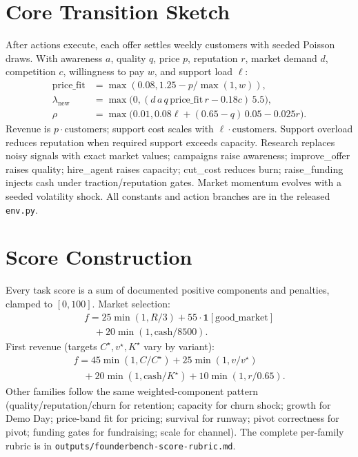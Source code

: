\documentclass[sigconf]{acmart}
\begin{document}
\section{Core Transition Sketch}
After actions execute, each offer settles weekly customers with seeded Poisson draws.
With awareness $a$, quality $q$, price $p$, reputation $r$, market demand $d$, competition $c$, willingness to pay $w$, and support load $\ell$:
\begin{align*}
\mathrm{price\_fit}&=\max(0.08,1.25-p/\max(1,w)),\\
\lambda_{\mathrm{new}}&=\max\bigl(0,(d\,a\,q\,\mathrm{price\_fit}\,r-0.18c)\,5.5\bigr),\\
\rho&=\max\bigl(0.01,0.08\ell+(0.65-q)\,0.05-0.025r\bigr).
\end{align*}
Revenue is $p\cdot\mathrm{customers}$; support cost scales with $\ell\cdot\mathrm{customers}$.
Support overload reduces reputation when required support exceeds capacity.
Research replaces noisy signals with exact market values; campaigns raise awareness; improve\_offer raises quality; hire\_agent raises capacity; cut\_cost reduces burn; raise\_funding injects cash under traction/reputation gates.
Market momentum evolves with a seeded volatility shock.
All constants and action branches are in the released \texttt{env.py}.

\section{Score Construction}
Every task score is a sum of documented positive components and penalties, clamped to $[0,100]$.
Market selection:
\begin{multline*}
f=25\min(1,R/3)+55\cdot\mathbf{1}[\mathrm{good\_market}]\\
\quad +20\min(1,\mathrm{cash}/8500).
\end{multline*}
First revenue (targets $C^\star,v^\star,K^\star$ vary by variant):
\begin{multline*}
f=45\min(1,C/C^\star)+25\min(1,v/v^\star)\\
\quad +20\min(1,\mathrm{cash}/K^\star)+10\min(1,r/0.65).
\end{multline*}
Other families follow the same weighted-component pattern (quality/reputation/churn for retention; capacity for churn shock; growth for Demo Day; price-band fit for pricing; survival for runway; pivot correctness for pivot; funding gates for fundraising; scale for channel).
The complete per-family rubric is in \texttt{outputs/founderbench-score-rubric.md}.
\end{document}
